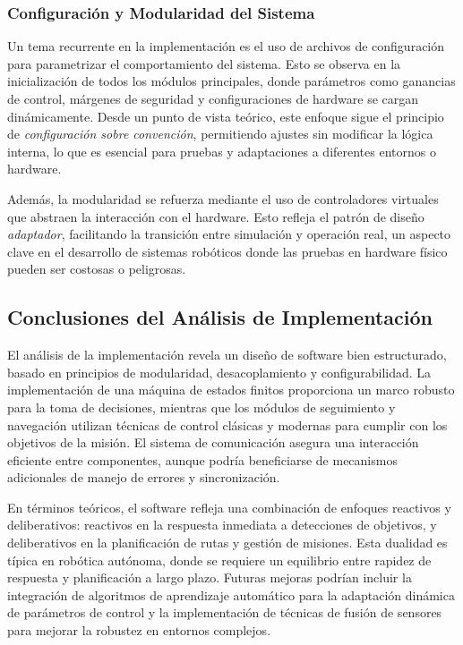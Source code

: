 \subsubsection{Configuración y Modularidad del Sistema}

Un tema recurrente en la implementación es el uso de archivos de configuración para parametrizar el comportamiento del sistema. Esto se observa en la inicialización de todos los módulos principales, donde parámetros como ganancias de control, márgenes de seguridad y configuraciones de hardware se cargan dinámicamente. Desde un punto de vista teórico, este enfoque sigue el principio de \textit{configuración sobre convención}, permitiendo ajustes sin modificar la lógica interna, lo que es esencial para pruebas y adaptaciones a diferentes entornos o hardware.

Además, la modularidad se refuerza mediante el uso de controladores virtuales que abstraen la interacción con el hardware. Esto refleja el patrón de diseño \textit{adaptador}, facilitando la transición entre simulación y operación real, un aspecto clave en el desarrollo de sistemas robóticos donde las pruebas en hardware físico pueden ser costosas o peligrosas.

\subsection{Conclusiones del Análisis de Implementación}

El análisis de la implementación revela un diseño de software bien estructurado, basado en principios de modularidad, desacoplamiento y configurabilidad. La implementación de una máquina de estados finitos proporciona un marco robusto para la toma de decisiones, mientras que los módulos de seguimiento y navegación utilizan técnicas de control clásicas y modernas para cumplir con los objetivos de la misión. El sistema de comunicación asegura una interacción eficiente entre componentes, aunque podría beneficiarse de mecanismos adicionales de manejo de errores y sincronización.

En términos teóricos, el software refleja una combinación de enfoques reactivos y deliberativos: reactivos en la respuesta inmediata a detecciones de objetivos, y deliberativos en la planificación de rutas y gestión de misiones. Esta dualidad es típica en robótica autónoma, donde se requiere un equilibrio entre rapidez de respuesta y planificación a largo plazo. Futuras mejoras podrían incluir la integración de algoritmos de aprendizaje automático para la adaptación dinámica de parámetros de control y la implementación de técnicas de fusión de sensores para mejorar la robustez en entornos complejos.